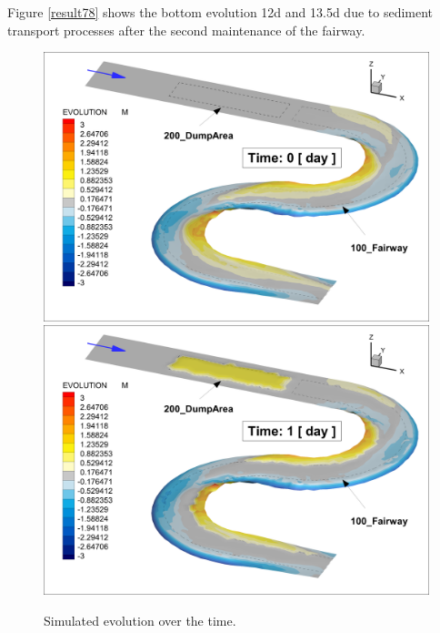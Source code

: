 Figure \ref{result78} shows the bottom evolution  12d and 13.5d due to sediment transport processes after the second maintenance of the fairway.

\begin{figure} [!h]
\centering
\includegraphics[scale=0.14]{critDig_Poly_00p0d.png}
\includegraphics[scale=0.14]{critDig_Poly_01p0d.png}
\caption{Simulated evolution over the time.}\label{result12}
\end{figure}

